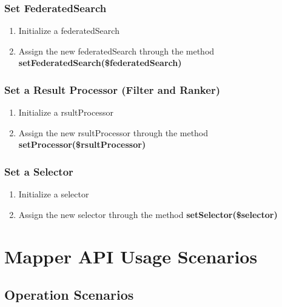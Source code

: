 \documentclass[letterpaper,10pt,english]{sphinxmanual}
\begin{document}
\subsubsection{Set FederatedSearch}
\label{docs/scenarios/uss:set-federatedsearch}\begin{enumerate}
\item {} 
Initialize a federatedSearch

\item {} 
Assign the new federatedSearch through the method \textbf{setFederatedSearch(\$federatedSearch)}

\end{enumerate}


\subsubsection{Set a Result Processor (Filter and Ranker)}
\label{docs/scenarios/uss:set-a-result-processor-filter-and-ranker}\begin{enumerate}
\item {} 
Initialize a rsultProcessor

\item {} 
Assign the new rsultProcessor through the method \textbf{setProcessor(\$rsultProcessor)}

\end{enumerate}


\subsubsection{Set a Selector}
\label{docs/scenarios/uss:set-a-selector}\begin{enumerate}
\item {} 
Initialize a selector

\item {} 
Assign the new selector through the method \textbf{setSelector(\$selector)}

\end{enumerate}


\section{Mapper API Usage Scenarios}
\label{docs/scenarios/mapper:mapper-api-usage-scenarios}\label{docs/scenarios/mapper::doc}

\subsection{Operation Scenarios}
\label{docs/scenarios/mapper:operation-scenarios}
\end{document}
